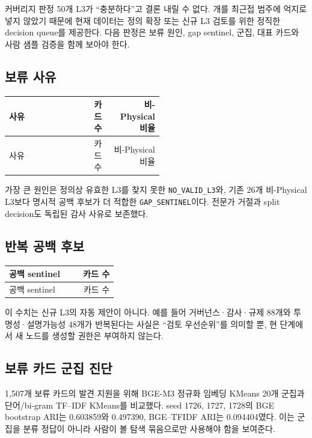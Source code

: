 \documentclass[11pt,a4paper]{article}
\newcommand{\code}[1]{\texttt{#1}}
\begin{document}
\begin{reviewbox}{커버리지 판정}
50개 L3가 “충분하다”고 결론 내릴 수 없다. \NeedsDecision{}개를 최근접 범주에 억지로 넣지 않았기 때문에 현재 데이터는 정의 확장 또는 신규 L3 검토를 위한 정직한 decision queue를 제공한다. 다음 판정은 보류 원인, gap sentinel, 군집, 대표 카드와 사람 샘플 검증을 함께 보아야 한다.
\end{reviewbox}

\subsection{보류 사유}

\begin{longtable}{L{0.51\linewidth}r r}
\toprule
사유 & 카드 수 & 비-Physical 비율 \\
\midrule
\endfirsthead
\toprule
사유 & 카드 수 & 비-Physical 비율 \\
\midrule
\endhead

\end{longtable}

가장 큰 원인은 정의상 유효한 L3를 찾지 못한 \code{NO\_VALID\_L3}와, 기존 26개 비-Physical L3보다 명시적 공백 후보가 더 적합한 \code{GAP\_SENTINEL}이다. 전문가 거절과 split decision도 독립된 감사 사유로 보존했다.

\subsection{반복 공백 후보}

\begin{longtable}{L{0.68\linewidth}r}
\toprule
공백 sentinel & 카드 수 \\
\midrule
\endfirsthead
\toprule
공백 sentinel & 카드 수 \\
\midrule
\endhead

\end{longtable}

이 수치는 신규 L3의 자동 제안이 아니다. 예를 들어 거버넌스·감사·규제 88개와 투명성·설명가능성 48개가 반복된다는 사실은 “검토 우선순위”를 의미할 뿐, 현 단계에서 새 노드를 생성할 권한은 부여하지 않는다.

\subsection{보류 카드 군집 진단}

1,507개 보류 카드의 발견 지원을 위해 BGE-M3 정규화 임베딩 KMeans 20개 군집과 단어/bi-gram TF--IDF KMeans를 비교했다. seed 1726, 1727, 1728의 BGE bootstrap ARI는 0.603859와 0.497390, BGE--TFIDF ARI는 0.094404였다. 이는 군집을 분류 정답이 아니라 사람이 볼 탐색 묶음으로만 사용해야 함을 보여준다.
\end{document}
